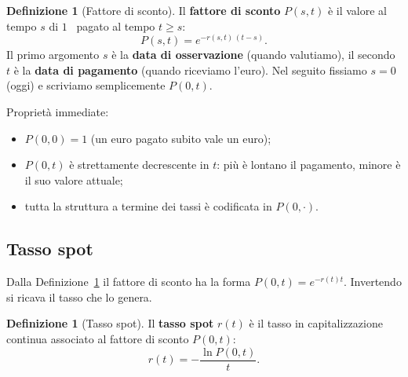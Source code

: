 \documentclass[11pt,a4paper]{article}
\theoremstyle{plain}
\theoremstyle{definition}
\newtheorem{definizione}[teorema]{Definizione}
\theoremstyle{remark}
\begin{document}
\begin{definizione}[Fattore di sconto]
\label{def:sconto}
Il \textbf{fattore di sconto} $P(s,t)$ \`e il valore al tempo $s$ di $1$~\texteuro{}
pagato al tempo $t \ge s$:
\[
  P(s,t) = e^{-r(s,t)\,(t-s)}.
\]
Il primo argomento $s$ \`e la \textbf{data di osservazione} (quando valutiamo), il secondo
$t$ \`e la \textbf{data di pagamento} (quando riceviamo l'euro). Nel seguito fissiamo
$s = 0$ (oggi) e scriviamo semplicemente $P(0,t)$.

Propriet\`a immediate:
\begin{itemize}
  \item $P(0,0) = 1$ (un euro pagato subito vale un euro);
  \item $P(0,t)$ \`e strettamente decrescente in $t$: pi\`u \`e lontano il pagamento, minore \`e il suo valore attuale;
  \item tutta la struttura a termine dei tassi \`e codificata in $P(0,\cdot)$.
\end{itemize}
\end{definizione}

\subsection{Tasso spot}

Dalla Definizione~\ref{def:sconto} il fattore di sconto ha la forma $P(0,t)=e^{-r(t)t}$.
Invertendo si ricava il tasso che lo genera.

\begin{definizione}[Tasso spot]
\label{def:spot}
Il \textbf{tasso spot} $r(t)$ \`e il tasso in capitalizzazione continua associato al
fattore di sconto $P(0,t)$:
\begin{equation}
  r(t) = -\frac{\ln P(0,t)}{t}.
  \label{eq:spot-inv}
\end{equation}
\end{definizione}

\end{document}
